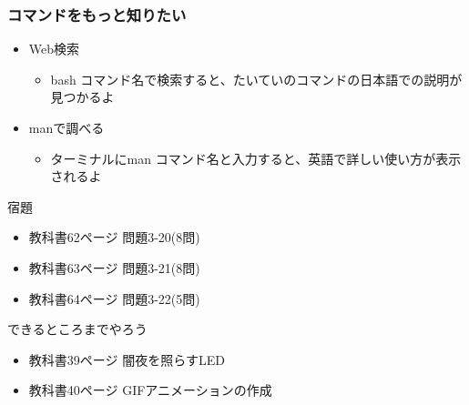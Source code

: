 \begin{frame}
    \frametitle{コマンドをもっと知りたい}
    \begin{itemize}
        \item Web検索
        \begin{itemize}
            \item bash コマンド名で検索すると、たいていのコマンドの日本語での説明が見つかるよ
        \end{itemize}
        \item manで調べる
        \begin{itemize}
            \item ターミナルにman コマンド名と入力すると、英語で詳しい使い方が表示されるよ
        \end{itemize}
    \end{itemize}
\end{frame}

\begin{frame}
    \begin{exampleblock}{宿題}
        \begin{itemize}
            \item 教科書62ページ 問題3-20(8問)
            \item 教科書63ページ 問題3-21(8問)
            \item 教科書64ページ 問題3-22(5問)
            \end{itemize}
    \end{exampleblock} 
    \begin{block}{できるところまでやろう}
        \begin{itemize}
            \item 教科書39ページ 闇夜を照らすLED
            \item 教科書40ページ GIFアニメーションの作成
        \end{itemize}
    \end{block} 
\end{frame}

